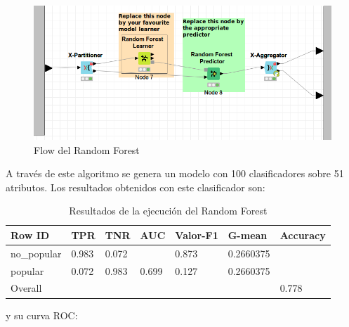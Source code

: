 \begin{figure}[H] %
	\centering
	\includegraphics[scale=0.4]{flow-rf-p.png}  %
	\caption{Flow del Random Forest} 
	\label{fig:flow-rf}
\end{figure}



A través de este algoritmo se genera un modelo con 100 clasificadores sobre 51 atributos. Los resultados obtenidos con este clasificador son:


\begin{table}[H]
	\centering
	\begin{tabular}{|l|l|l|l|l|l|l|}
		\hline
		Row ID      & TPR   & TNR   & AUC   & Valor-F1 & G-mean    & Accuracy \\ \hline
		no\_popular & 0.983 & 0.072 &       & 0.873    & 0.2660375 &          \\ \hline
		popular     & 0.072 & 0.983 & 0.699 & 0.127    & 0.2660375 &          \\ \hline
		Overall     &       &       &       &          &           & 0.778    \\ \hline
	\end{tabular}
	\caption{Resultados de la ejecución del Random Forest}
	\label{tab:rf}
\end{table}

y su curva ROC:


